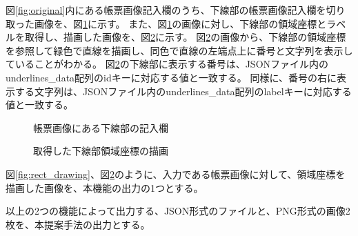 図\ref{fig:original}内にある帳票画像記入欄のうち、下線部の帳票画像記入欄を切り取った画像を、図\ref{fig:underline_original}に示す。
また、図\ref{fig:underline_original}の画像に対し、下線部の領域座標とラベルを取得し、描画した画像を、図\ref{fig:underline_drawing}に示す。
図\ref{fig:underline_drawing}の画像から、下線部の領域座標を参照して緑色で直線を描画し、同色で直線の左端点上に番号と文字列を表示していることがわかる。
図\ref{fig:underline_drawing}の下線部に表示する番号は、JSONファイル内のunderlines\_data配列のidキーに対応する値と一致する。
同様に、番号の右に表示する文字列は、JSONファイル内のunderlines\_data配列のlabelキーに対応する値と一致する。

\begin{figure}[t]
    \begin{center}
        \caption{帳票画像にある下線部の記入欄}
        \label{fig:underline_original}
    \end{center}
\end{figure}

\begin{figure}[t]
    \begin{center}
        \caption{取得した下線部領域座標の描画}
        \label{fig:underline_drawing}
    \end{center}
\end{figure}

図\ref{fig:rect_drawing}、図\ref{fig:underline_drawing}のように、入力である帳票画像に対して、領域座標を描画した画像を、本機能の出力の1つとする。

以上の2つの機能によって出力する、JSON形式のファイルと、PNG形式の画像2枚を、本提案手法の出力とする。
